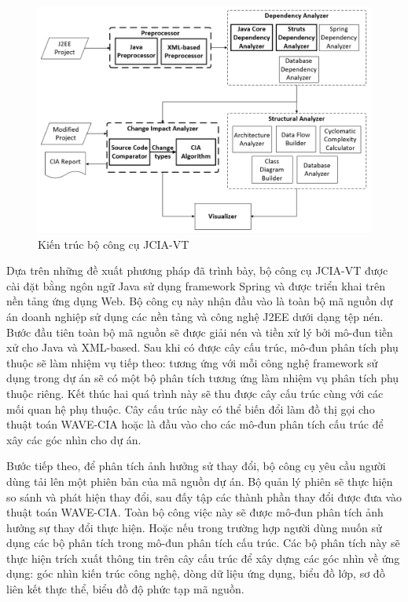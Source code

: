 \documentclass[12pt]{report}
\begin{document}
\begin{figure}[h]
	\centering
	\includegraphics[scale=0.7]{jcia-vt-architecture}
	\caption{Kiến trúc bộ công cụ JCIA-VT}
	\label{fig:jcia-vt-architecture}
\end{figure}

Dựa trên những đề xuất phương pháp đã trình bày, bộ công cụ JCIA-VT được cài đặt bằng ngôn ngữ Java sử dụng framework Spring và được triển khai trên nền tảng ứng dụng Web. Bộ công cụ này nhận đầu vào là toàn bộ mã nguồn dự án doanh nghiệp sử dụng các nền tảng và công nghệ J2EE dưới dạng tệp nén. Bước đầu tiên toàn bộ mã nguồn sẽ được giải nén và tiền xử lý bởi mô-đun tiền xử cho Java và XML-based. Sau khi có được cây cấu trúc, mô-đun phân tích phụ thuộc sẽ làm nhiệm vụ tiếp theo: tương ứng với mỗi công nghệ framework sử dụng trong dự án sẽ có một bộ phân tích tương ứng làm nhiệm vụ phân tích phụ thuộc riêng. Kết thúc hai quá trình này sẽ thu được cây cấu trúc cùng với các mối quan hệ phụ thuộc. Cây cấu trúc này có thể biến đổi làm đồ thị gọi cho thuật toán WAVE-CIA hoặc là đầu vào cho các mô-đun phân tích cấu trúc để xây các góc nhìn cho dự án.

Bước tiếp theo, để phân tích ảnh hưởng sử thay đổi, bộ công cụ yêu cầu người dùng tải lên một phiên bản của mã nguồn dự án. Bộ quản lý phiên sẽ thực hiện so sánh và phát hiện thay đổi, sau đấy tập các thành phần thay đổi được đưa vào thuật toán WAVE-CIA. Toàn bộ công việc này sẽ được mô-đun phân tích ảnh hưởng sự thay đổi thực hiện. Hoặc nếu trong trường hợp người dùng muốn sử dụng các bộ phân tích trong mô-đun phân tích cấu trúc. Các bộ phân tích này sẽ thực hiện trích xuất thông tin trên cây cấu trúc để xây dựng các góc nhìn về ứng dụng: góc nhìn kiến trúc công nghệ, dòng dữ liệu ứng dụng, biểu đồ lớp, sơ đồ liên kết thực thể, biểu đồ độ phức tạp mã nguồn.
\end{document}
